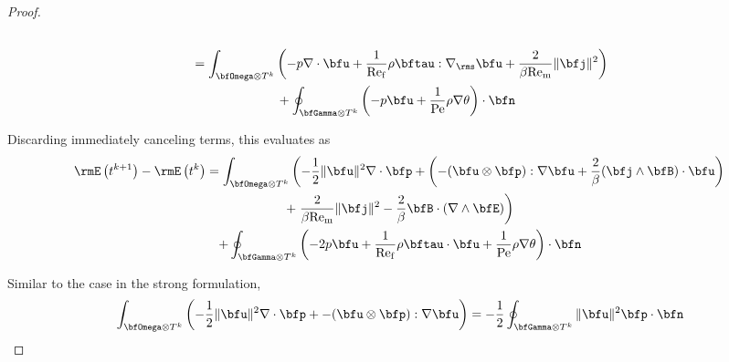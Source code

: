 \begin{proof}
\begin{align}
\begin{split}
                \end{split}  \\
                \begin{split}
                    &=  \int_{\bfOmega\otimes T^{k}}\left(- p\nabla\cdot\bfu + \frac{1}{\rmRef}\rho\bftau:\nabla_{\rms}\bfu + \frac{2}{\beta\rmRem}\|\bfj\|^{2}\right)  \\
                    &\;\;\;\;\;\;\;\;\;\;\;\;\;\;\;\;\;\;\;\;\;\;\;\;+ \oint_{\bfGamma\otimes T^{k}}\left(- p\bfu + \frac{1}{\rmPe}\rho\nabla\theta\right)\cdot\bfn
                \end{split}
            \end{align}
    
            Discarding immediately canceling terms, this evaluates as
            \begin{multline}
                \rmE\left(t^{k + 1}\right) - \rmE\left(t^{k}\right)  =  \int_{\bfOmega\otimes T^{k}}\left( - \frac{1}{2}\|\bfu\|^{2}\nabla\cdot\bfp + \left(- (\bfu\otimes\bfp):\nabla\bfu + \frac{2}{\beta}(\bfj\wedge\bfB)\cdot\bfu\right)\right.  \\
                + \left.\frac{2}{\beta\rmRem}\|\bfj\|^{2} - \frac{2}{\beta}\bfB\cdot(\nabla\wedge\bfE)\right)  \\
                + \oint_{\bfGamma\otimes T^{k}}\left(- 2p\bfu + \frac{1}{\rmRef}\rho\bftau\cdot\bfu + \frac{1}{\rmPe}\rho\nabla\theta\right)\cdot\bfn
            \end{multline}
            
            Similar to the case in the strong formulation,
            \begin{equation}
                \int_{\bfOmega\otimes T^{k}}\left( - \frac{1}{2}\|\bfu\|^{2}\nabla\cdot\bfp + - (\bfu\otimes\bfp):\nabla\bfu\right)  =  - \frac{1}{2}\oint_{\bfGamma\otimes T^{k}}\|\bfu\|^{2}\bfp\cdot\bfn
            \end{equation}
            

\end{proof}
